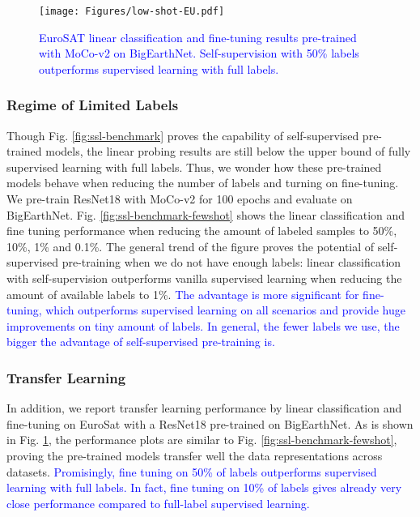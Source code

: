 \documentclass[lettersize,journal]{IEEEtran}
\begin{document}
\begin{figure}
\centering
\texttt{[image: Figures/low-shot-EU.pdf]}
\caption[benchmark-SSL-RS-transfer]{
\textcolor{blue}{
EuroSAT linear classification and fine-tuning results pre-trained with MoCo-v2 on BigEarthNet. Self-supervision with 50\% labels outperforms supervised learning with full labels.
}
}
\label{fig:ssl-benchmark-transfer}
\end{figure}

\subsubsection{Regime of Limited Labels}

Though Fig. \ref{fig:ssl-benchmark} proves the capability of self-supervised pre-trained models, the linear probing results are still below the upper bound of fully supervised learning with full labels. Thus, we wonder how these pre-trained models behave when reducing the number of labels and turning on fine-tuning. We pre-train ResNet18 with MoCo-v2 for 100 epochs and evaluate on BigEarthNet. Fig. \ref{fig:ssl-benchmark-fewshot} shows the linear classification and fine tuning performance when reducing the amount of labeled samples to 50\%, 10\%, 1\% and 0.1\%. The general trend of the figure proves the potential of self-supervised pre-training when we do not have enough labels: linear classification with self-supervision outperforms vanilla supervised learning when reducing the amount of available labels to 1\%. \textcolor{blue}{The advantage is more significant for fine-tuning, which outperforms supervised learning on all scenarios and provide huge improvements on tiny amount of labels. In general, the fewer labels we use, the bigger the advantage of self-supervised pre-training is.}  


\subsubsection{Transfer Learning}

In addition, we report transfer learning performance by linear classification and fine-tuning on EuroSat with a ResNet18 pre-trained on BigEarthNet. As is shown in Fig. \ref{fig:ssl-benchmark-transfer}, the performance plots are similar to Fig. \ref{fig:ssl-benchmark-fewshot}, proving the pre-trained models transfer well the data representations across datasets. 
\textcolor{blue}{Promisingly, fine tuning on 50\% of labels outperforms supervised learning with full labels. In fact, fine tuning on 10\% of labels gives already very close performance compared to full-label supervised learning.}
\end{document}
